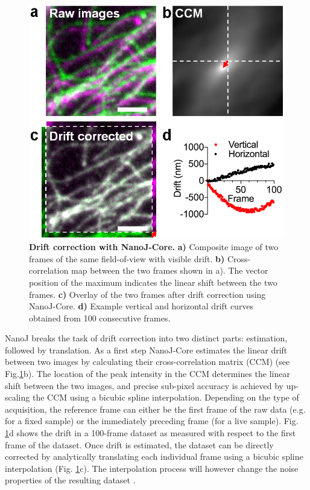  \begin{figure}[!t]
    \centering
    \includegraphics[width=\linewidth]{Figures/FigureDrift_v2.png}
    \caption{\textbf{Drift correction with NanoJ-Core.} \textbf{a)} Composite image of two frames of the same field-of-view with visible drift. \textbf{b)} Cross-correlation map between the two frames shown in a). The vector position of the maximum indicates the linear shift between the two frames. \textbf{c)} Overlay of the two frames after drift correction using NanoJ-Core. \textbf{d)} Example vertical and horizontal drift curves obtained from 100 consecutive frames.}
    \label{fig:DriftCorrection}
 \end{figure}

 NanoJ breaks the task of drift correction into two distinct parts: estimation, followed by translation. As a first step NanoJ-Core estimates the linear drift between two images by calculating their cross-correlation matrix (CCM) (see Fig.\ref{fig:DriftCorrection}b). The location of the peak intensity in the CCM determines the linear shift between the two images, and precise sub-pixel accuracy is achieved by up-scaling the CCM using a bicubic spline interpolation. Depending on the type of acquisition, the reference frame can either be the first frame of the raw data (e.g. for a fixed sample) or the immediately preceding frame (for a live sample). Fig. \ref{fig:DriftCorrection}d shows the drift in a 100-frame dataset as measured with respect to the first frame of the dataset. Once drift is estimated, the dataset can be directly corrected by analytically translating each individual frame using a bicubic spline interpolation (Fig. \ref{fig:DriftCorrection}c). The interpolation process will however change the noise properties of the resulting dataset \cite{blaysat2016effect}.
 
